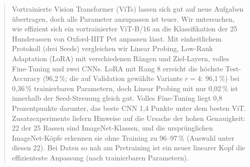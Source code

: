 \begin{abstract}
Vortrainierte Vision Transformer (ViTs) lassen sich gut auf neue Aufgaben übertragen, doch alle
Parameter anzupassen ist teuer. Wir untersuchen, wie effizient sich ein vortrainierter ViT-B/16 an die
Klassifikation der 25 Hunderassen von Oxford-IIIT Pet anpassen lässt. Mit einheitlichem Protokoll
(drei Seeds) vergleichen wir Linear Probing, Low-Rank Adaptation (LoRA) mit verschiedenen Rängen und
Ziel-Layern, volles Fine-Tuning und zwei CNNs. LoRA mit Rang 8 erreicht die
höchste Test-Accuracy (96,2\,\%; die auf Validation gewählte Variante $r=4$: 96,1\,\%) bei 0,36\,\% trainierbaren Parametern, doch Linear Probing mit nur
0,02\,\% ist innerhalb der Seed-Streuung gleich gut. Volles Fine-Tuning liegt 0,8 Prozentpunkte darunter,
das beste CNN 1,4 Punkte unter dem besten ViT. Zusatzexperimente liefern Hinweise auf die Ursache der hohen Genauigkeit: 22 der 25
Rassen sind ImageNet-Klassen, und die ursprünglichen ImageNet-Köpfe erkennen sie ohne Training zu
96--97\,\% (Auswahl unter diesen 22). Bei Daten so nah am Pretraining ist ein neuer linearer Kopf die
effizienteste Anpassung (nach trainierbaren Parametern).
\end{abstract}
